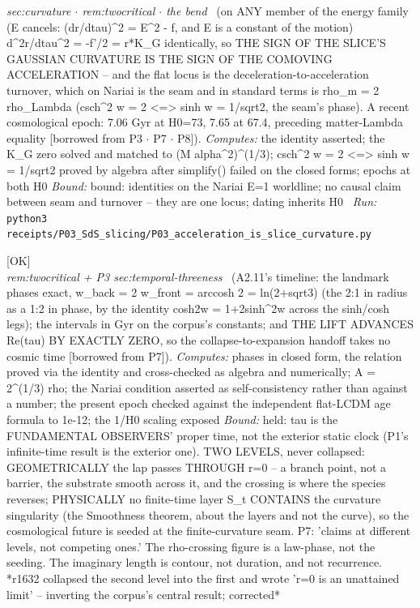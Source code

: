 \begin{description}
\textit{sec:curvature \ensuremath{\cdot} rem:twocritical \ensuremath{\cdot} the bend} \ (on ANY member of the energy family (E cancels: (dr/dtau)\textasciicircum{}2 = E\textasciicircum{}2 - f, and E is a constant of the motion) d\textasciicircum{}2r/dtau\textasciicircum{}2 = -f'/2 = r*K\_G identically, so THE SIGN OF THE SLICE'S GAUSSIAN CURVATURE IS THE SIGN OF THE COMOVING ACCELERATION -- and the flat locus is the deceleration-to-acceleration turnover, which on Nariai is the seam and in standard terms is rho\_m = 2 rho\_Lambda (csch\textasciicircum{}2 w = 2 <=> sinh w = 1/sqrt2, the seam's phase). A recent cosmological epoch: 7.06 Gyr at H0=73, 7.65 at 67.4, preceding matter-Lambda equality [borrowed from P3 \ensuremath{\cdot} P7 \ensuremath{\cdot} P8]). 
\emph{Computes:} the identity asserted; the K\_G zero solved and matched to (M alpha\textasciicircum{}2)\textasciicircum{}(1/3); csch\textasciicircum{}2 w = 2 <=> sinh w = 1/sqrt2 proved by algebra after simplify() failed on the closed forms; epochs at both H0
 \emph{Bound:} bound: identities on the Nariai E=1 worldline; no causal claim between seam and turnover -- they are one locus; dating inherits H0
\ \emph{Run:} \texttt{python3 receipts/P03\_SdS\_slicing/P03\_acceleration\_is\_slice\_curvature.py}
\item[\rcptlabel{P07_lap_timeline}{P7R5}\textbf{P7R5}\quad\texttt{P07\_lap\_timeline}]\hfill\textsf{[OK]}\\
\textit{rem:twocritical + P3 sec:temporal-threeness} \ (A2.11's timeline: the landmark phases exact, w\_back = 2 w\_front = arccosh 2 = ln(2+sqrt3) (the 2:1 in radius as a 1:2 in phase, by the identity cosh2w = 1+2sinh\textasciicircum{}2w across the sinh/cosh legs); the intervals in Gyr on the corpus's constants; and THE LIFT ADVANCES Re(tau) BY EXACTLY ZERO, so the collapse-to-expansion handoff takes no cosmic time [borrowed from P7]). 
\emph{Computes:} phases in closed form, the relation proved via the identity and cross-checked as algebra and numerically; A = 2\textasciicircum{}(1/3) rho; the Nariai condition asserted as self-consistency rather than against a number; the present epoch checked against the independent flat-LCDM age formula to 1e-12; the 1/H0 scaling exposed
 \emph{Bound:} held: tau is the FUNDAMENTAL OBSERVERS' proper time, not the exterior static clock (P1's infinite-time result is the exterior one). TWO LEVELS, never collapsed: GEOMETRICALLY the lap passes THROUGH r=0 -- a branch point, not a barrier, the substrate smooth across it, and the crossing is where the species reverses; PHYSICALLY no finite-time layer S\_t CONTAINS the curvature singularity (the Smoothness theorem, about the layers and not the curve), so the cosmological future is seeded at the finite-curvature seam. P7: 'claims at different levels, not competing ones.' The rho-crossing figure is a law-phase, not the seeding. The imaginary length is contour, not duration, and not recurrence. *r1632 collapsed the second level into the first and wrote 'r=0 is an unattained limit' -- inverting the corpus's central result; corrected*

\end{description}
